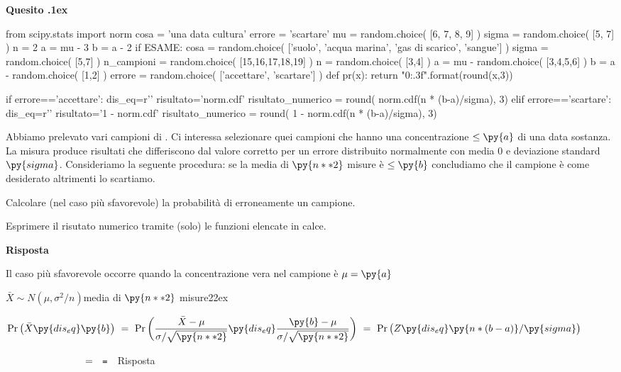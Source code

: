 \documentclass[11pt,twoside,a4paper]{article}
\newcounter{quesito}
\newenvironment{question}{\addtocounter{quesito}{1}\par\textbf{Quesito \thequesito.\kern1ex}}{\vspace{0.5\parskip}}
\newenvironment{answer}{\par\textbf{Risposta\quad}}{\vspace{\parskip}}
\begin{document}
\bigskip\bigskip
\begin{question} %
\begin{pycode}
from scipy.stats import norm
cosa = 'una data cultura'
errore = 'scartare'
mu    = random.choice( [6, 7, 8, 9] )
sigma = random.choice( [5, 7] )
n = 2
a = mu - 3 
b = a - 2
if ESAME:
    cosa = random.choice( ['suolo', 'acqua marina', 'gas di scarico', 'sangue'] )
    sigma = random.choice( [5,7] )
    n_campioni = random.choice( [15,16,17,18,19] )
    n = random.choice( [3,4] )
    a = mu - random.choice( [3,4,5,6] )
    b = a - random.choice( [1,2] )
    errore =  random.choice( ['accettare', 'scartare'] )
def pr(x):
    return "{0:.3f}".format(round(x,3))

if errore=='accettare':
    dis_eq=r'\le'
    risultato='norm.cdf'
    risultato_numerico = round( norm.cdf(n * (b-a)/sigma), 3)
elif errore=='scartare':
    dis_eq=r'\ge'
    risultato='1 - norm.cdf'
    risultato_numerico = round( 1 -  norm.cdf(n * (b-a)/sigma), 3)
\end{pycode}
Abbiamo prelevato vari campioni di . Ci interessa selezionare quei campioni che hanno una concentrazione $\le\py{a}$ di una data sostanza. La misura produce risultati che differiscono dal valore corretto per un errore distribuito normalmente con media $0$ e deviazione standard $\py{sigma}$. Consideriamo la seguente procedura: se la media di $\py{n**2}$ misure è $\le\py{b}$ concludiamo che il campione è come desiderato altrimenti lo scartiamo.

Calcolare (nel caso più sfavorevole) la probabilità di  erroneamente un campione.

Esprimere il risutato numerico tramite (solo) le funzioni elencate in calce.
\begin{answer}

Il caso più sfavorevole occorre quando la concentrazione vera nel campione è $\mu=\py{a}$ 


$\bar X\sim N(\mu,\sigma^2/n)$\hfill media di $\py{n**2}$ misure\kern22ex

$\displaystyle\Pr\big(\bar X\py{dis_eq}\py{b}\big)\ =\ \Pr\bigg(\frac{\bar X-\mu}{\sigma/\sqrt{\py{n**2}}}\py{dis_eq}\frac{\py{b}-\mu}{\sigma/\sqrt{\py{n**2}}}\bigg)\ =\  \Pr\big(Z\py{dis_eq}\py{n * (b-a) } /\py{sigma} \big)$

$\phantom{\Pr\big(\bar X\le\py{b}\big)}\ =\ ${}{\tt\ =\  }\hfill {\color{blue}\hfill Risposta}

\end{answer}
\end{question}
\end{document}
